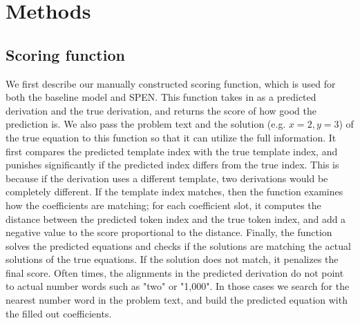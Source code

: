 \documentclass[11pt,letterpaper]{article}
\begin{document}
\section{Methods}
\subsection{Scoring function}
We first describe our manually constructed scoring function, which is used for both the baseline model and SPEN. This function takes in as a predicted derivation and the true derivation, and returns the score of how good the prediction is. We also pass the problem text and the solution (e.g. $x=2, y=3$) of the true equation to this function so that it can utilize the full information. It first compares the predicted template index with the true template index, and punishes significantly if the predicted index differs from the true index. This is because if the derivation uses a different template, two derivations would be completely different. If the template index matches, then the function examines how the coefficients are matching; for each coefficient slot, it computes the distance between the predicted token index and the true token index, and add a negative value to the score proportional to the distance. Finally, the function solves the predicted equations and checks if the solutions are matching the actual solutions of the true equations. If the solution does not match, it penalizes the final score. Often times, the alignments in the predicted derivation do not point to actual number words such as "two" or "1,000". In those cases we search for the nearest number word in the problem text, and build the predicted equation with the filled out coefficients.
\end{document}
